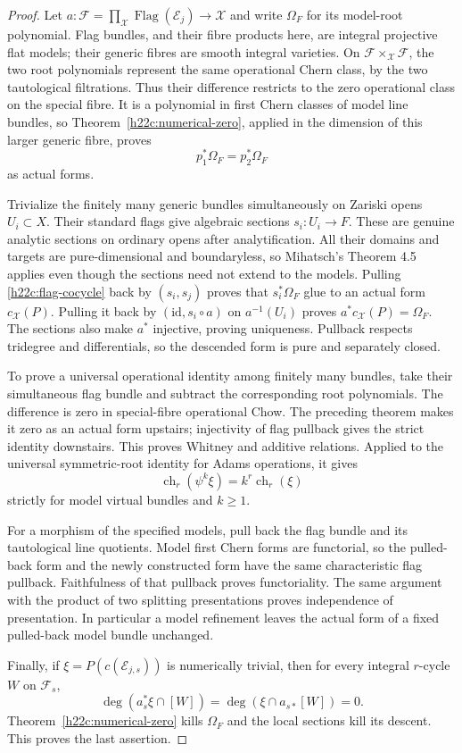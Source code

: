 \documentclass[11pt,a4paper]{article}
\theoremstyle{definition}
\theoremstyle{remark}
\begin{document}
\begin{proof}
Let
$a:\mathcal F=\prod_{\mathcal X}\operatorname{Flag}(\mathcal E_j)
\to\mathcal X$ and write $\Omega_F$ for its model-root polynomial.
Flag bundles, and their fibre products here, are integral projective
flat models; their generic fibres are smooth integral varieties.
On $\mathcal F\times_{\mathcal X}\mathcal F$, the two root
polynomials represent the same operational Chern class, by the two
tautological filtrations.  Thus their difference restricts to the
zero operational class on the special fibre.  It is a polynomial
in first Chern classes of model line bundles, so
Theorem~\ref{h22c:numerical-zero}, applied in the dimension of this
larger generic fibre, proves
\[
                         p_1^*\Omega_F=p_2^*\Omega_F
\tag{H22.C2}\label{h22c:flag-cocycle}
\]
as actual forms.

Trivialize the finitely many generic bundles simultaneously on
Zariski opens $U_i\subset X$.  Their standard flags give algebraic
sections $s_i:U_i\to F$.  These are genuine analytic sections on
ordinary opens after analytification.  All their domains and targets
are pure-dimensional and boundaryless, so Mihatsch's Theorem 4.5
applies even though the sections need not extend to the models.
Pulling \eqref{h22c:flag-cocycle} back by $(s_i,s_j)$ proves that
$s_i^*\Omega_F$ glue to an actual form $c_{\mathcal X}(P)$.
Pulling it back by $(\mathrm{id},s_i\circ a)$ on $a^{-1}(U_i)$
proves $a^*c_{\mathcal X}(P)=\Omega_F$.  The sections also make
$a^*$ injective, proving uniqueness.  Pullback respects tridegree
and differentials, so the descended form is pure and separately
closed.

To prove a universal operational identity among finitely many
bundles, take their simultaneous flag bundle and subtract the
corresponding root polynomials.  The difference is zero in
special-fibre operational Chow.  The preceding theorem makes it
zero as an actual form upstairs; injectivity of flag pullback gives
the strict identity downstairs.  This proves Whitney and additive
relations.  Applied to the universal symmetric-root identity for
Adams operations, it gives
\[
          \operatorname{ch}_r(\psi^k\xi)=k^r\operatorname{ch}_r(\xi)
\]
strictly for model virtual bundles and $k\ge1$.

For a morphism of the specified models, pull back the flag bundle
and its tautological line quotients.  Model first Chern forms are
functorial, so the pulled-back form and the newly constructed form
have the same characteristic flag pullback.  Faithfulness of that
pullback proves functoriality.  The same argument with the product
of two splitting presentations proves independence of presentation.
In particular a model refinement leaves the actual form of a fixed
pulled-back model bundle unchanged.

Finally, if $\xi=P(c(\mathcal E_{j,s}))$ is numerically trivial,
then for every integral $r$-cycle $W$ on $\mathcal F_s$,
\[
             \deg(a_s^*\xi\cap[W])
               =\deg(\xi\cap a_{s*}[W])=0.
\]
Theorem~\ref{h22c:numerical-zero} kills $\Omega_F$ and the local
sections kill its descent.  This proves the last assertion.
\end{proof}
\end{document}
